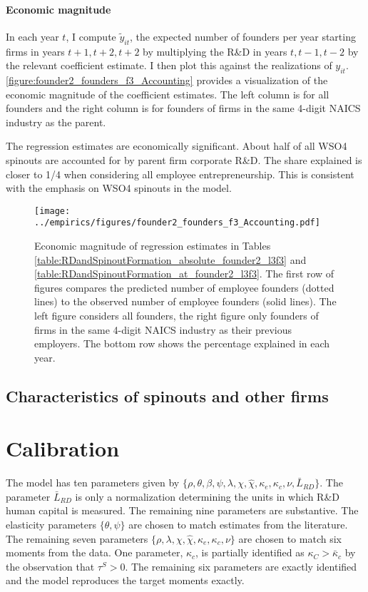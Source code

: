 \documentclass[11pt,english]{article}
\theoremstyle{remark}
\begin{document}
\paragraph{Economic magnitude}

In each year $t$, I compute $\tilde{y}_{it}$, the expected number of founders per year starting firms in years $t+1,t+2,t+2$ by multiplying the R\&D in years $t,t-1,t-2$ by the relevant coefficient estimate. I then plot this against the realizations of $y_{it}$. \autoref{figure:founder2_founders_f3_Accounting} provides a visualization of the economic magnitude of the coefficient estimates. The left column is for all founders and the right column is for founders of firms in the same 4-digit NAICS industry as the parent. 

The regression estimates are economically significant. About half of all WSO4 spinouts are accounted for by parent firm corporate R\&D. The share explained is closer to 1/4 when considering all employee entrepreneurship. This is consistent with the emphasis on WSO4 spinouts in the model. 

\begin{figure}[!htb]
	\texttt{[image: ../empirics/figures/founder2\_founders\_f3\_Accounting.pdf]}
	\caption{Economic magnitude of regression estimates in Tables \ref{table:RDandSpinoutFormation_absolute_founder2_l3f3} and \ref{table:RDandSpinoutFormation_at_founder2_l3f3}. The first row of figures compares the predicted number of employee founders (dotted lines) to the observed number of employee founders (solid lines). The left figure considers all founders, the right figure only founders of firms in the same 4-digit NAICS industry as their previous employers. The bottom row shows the percentage explained in each year.}
	\label{figure:founder2_founders_f3_Accounting}
\end{figure}


\subsection{Characteristics of spinouts and other firms}

\section{Calibration}

The model has ten parameters given by $\{\rho, \theta, \beta, \psi, \lambda, \chi, \hat{\chi}, \kappa_e, \kappa_c, \nu, \bar{L}_{RD}\}$. The parameter $\bar{L}_{RD}$ is only a normalization determining the units in which R\&D human capital is measured. The remaining nine parameters are substantive. The elasticity parameters $\{\theta, \psi\}$ are chosen to match estimates from the literature. The remaining seven parameters $\{\rho, \lambda, \chi, \hat{\chi}, \kappa_e, \kappa_c, \nu\}$ are chosen to match six moments from the data. One parameter, $\kappa_c$, is partially identified as $\kappa_C > \bar{\kappa}_c$ by the observation that $\tau^S > 0$. The remaining six parameters are exactly identified and the model reproduces the target moments exactly. 
\end{document}

